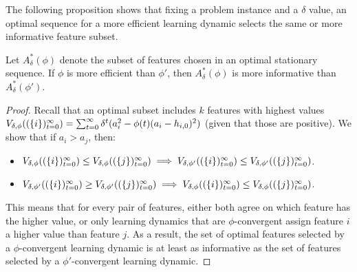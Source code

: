 The following proposition shows that fixing a problem instance and a $\delta$ value, an optimal sequence for a more efficient learning dynamic selects the same or more informative feature subset. 

\begin{proposition} \label{prop-phi-increases}
    Let $A^{*}_{\delta}(\phi)$ denote the subset of features chosen in an optimal stationary sequence. If $\phi$ is more efficient than $\phi'$, then $A^{*}_{\delta}(\phi)$ is more informative than $A^{*}_{\delta}(\phi')$.
\end{proposition}
\begin{proof}
    Recall that an optimal subset includes $k$ features with highest values $V_{\delta,\phi}((\{i\})_{t=0}^\infty) = \sum_{t=0}^\infty \delta^t (a_i^2-\phi(t)(a_i-h_{i,0})^2)$ (given that those are positive). 
    We show that if $a_i>a_j$, then:
    \begin{itemize}
\item $V_{\delta,\phi}((\{i\})_{t=0}^\infty) \leq V_{\delta,\phi}((\{j\})_{t=0}^\infty) \implies V_{\delta,\phi'}((\{i\})_{t=0}^\infty) \leq V_{\delta,\phi'}((\{j\})_{t=0}^\infty)$. 
\item $V_{\delta,\phi'}((\{i\})_{t=0}^\infty) \geq V_{\delta,\phi'}((\{j\})_{t=0}^\infty) \implies
V_{\delta,\phi}((\{i\})_{t=0}^\infty) \leq V_{\delta,\phi}((\{j\})_{t=0}^\infty)$.
    \end{itemize}
    This means that for every pair of features, either both agree on which feature has the higher value, or only learning dynamics that are $\phi$-convergent assign feature $i$ a higher value than feature $j$. As a result, the set of optimal features selected by a $\phi$-convergent learning dynamic is at least as informative as the set of features selected by a $\phi'$-convergent learning dynamic.



\end{proof}
